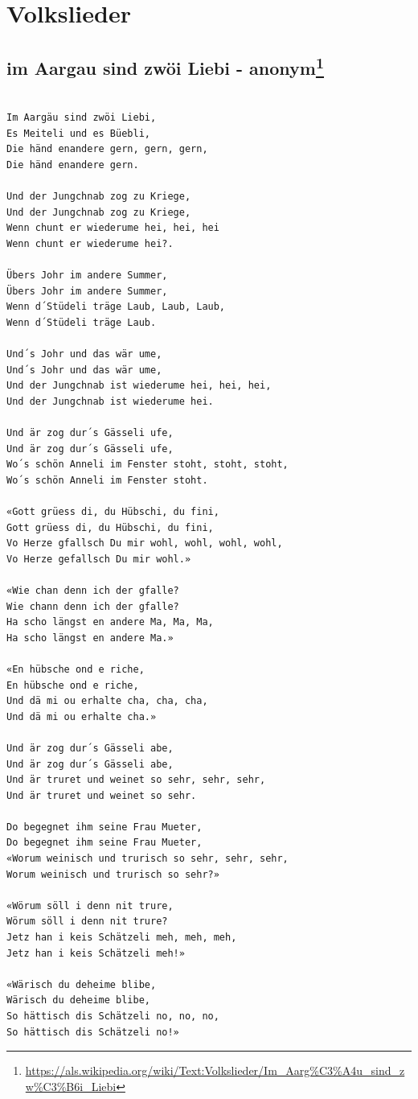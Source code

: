 \documentclass[
]{book}
\let\stdsection\section
\renewcommand\section{\clearpage\stdsection}
\begin{document}
\hypertarget{volkslieder}{%
\chapter{Volkslieder}\label{volkslieder}}

\hypertarget{volsklieder-im-aargau}{%
\section[im Aargau sind zwöi Liebi - anonym]{\texorpdfstring{im Aargau sind zwöi Liebi - anonym\footnote{\url{https://als.wikipedia.org/wiki/Text:Volkslieder/Im_Aarg\%C3\%A4u_sind_zw\%C3\%B6i_Liebi}}}{im Aargau sind zwöi Liebi - anonym}}\label{volsklieder-im-aargau}}

\begin{verbatim}

Im Aargäu sind zwöi Liebi,
Es Meiteli und es Büebli,
Die händ enandere gern, gern, gern,
Die händ enandere gern.

Und der Jungchnab zog zu Kriege,
Und der Jungchnab zog zu Kriege,
Wenn chunt er wiederume hei, hei, hei
Wenn chunt er wiederume hei?.

Übers Johr im andere Summer,
Übers Johr im andere Summer,
Wenn d´Stüdeli träge Laub, Laub, Laub,
Wenn d´Stüdeli träge Laub.

Und´s Johr und das wär ume,
Und´s Johr und das wär ume,
Und der Jungchnab ist wiederume hei, hei, hei,
Und der Jungchnab ist wiederume hei.

Und är zog dur´s Gässeli ufe,
Und är zog dur´s Gässeli ufe,
Wo´s schön Anneli im Fenster stoht, stoht, stoht,
Wo´s schön Anneli im Fenster stoht.

«Gott grüess di, du Hübschi, du fini,
Gott grüess di, du Hübschi, du fini,
Vo Herze gfallsch Du mir wohl, wohl, wohl, wohl,
Vo Herze gefallsch Du mir wohl.»

«Wie chan denn ich der gfalle?
Wie chann denn ich der gfalle?
Ha scho längst en andere Ma, Ma, Ma,
Ha scho längst en andere Ma.»

«En hübsche ond e riche,
En hübsche ond e riche,
Und dä mi ou erhalte cha, cha, cha,
Und dä mi ou erhalte cha.»

Und är zog dur´s Gässeli abe,
Und är zog dur´s Gässeli abe,
Und är truret und weinet so sehr, sehr, sehr,
Und är truret und weinet so sehr.

Do begegnet ihm seine Frau Mueter,
Do begegnet ihm seine Frau Mueter,
«Worum weinisch und trurisch so sehr, sehr, sehr,
Worum weinisch und trurisch so sehr?»

«Wörum söll i denn nit trure,
Wörum söll i denn nit trure?
Jetz han i keis Schätzeli meh, meh, meh,
Jetz han i keis Schätzeli meh!»

«Wärisch du deheime blibe,
Wärisch du deheime blibe,
So hättisch dis Schätzeli no, no, no,
So hättisch dis Schätzeli no!» 
\end{verbatim}
\end{document}
